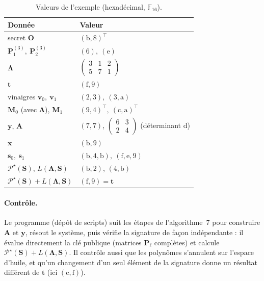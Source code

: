 \begin{table}[ht]\centering\small
\caption{Valeurs de l'exemple (hexadécimal, $\mathbb{F}_{16}$).}
\begin{tabular}{@{}ll@{}}\toprule
Donnée & Valeur\\\midrule
secret $\mathbf{O}$ & $(\mathrm{b},8)^{\top}$\\
$\mathbf{P}^{(3)}_1,\ \mathbf{P}^{(3)}_2$ & $(6),\ (\mathrm{e})$\\
$\boldsymbol{\Lambda}$ & $\begin{pmatrix}3&1&2\\5&7&1\end{pmatrix}$\\
$\mathbf{t}$ & $(\mathrm{f},9)$\\
vinaigres $\mathbf{v}_0,\ \mathbf{v}_1$ & $(2,3),\ (3,\mathrm{a})$\\
$\mathbf{M}_0$ (avec $\boldsymbol{\Lambda}$), $\mathbf{M}_1$ & $(9,4)^{\top},\ (\mathrm{c},\mathrm{a})^{\top}$\\
$\mathbf{y}$, $\mathbf{A}$ & $(7,7)$, $\begin{pmatrix}6&3\\2&4\end{pmatrix}$ (déterminant $\mathrm{d}$)\\
$\mathbf{x}$ & $(\mathrm{b},9)$\\
$\mathbf{s}_0,\ \mathbf{s}_1$ & $(\mathrm{b},4,\mathrm{b}),\ (\mathrm{f},\mathrm{e},9)$\\
$\mathcal{P}^\star(\mathbf{S})$, $L(\boldsymbol{\Lambda},\mathbf{S})$ & $(\mathrm{b},2)$, $(4,\mathrm{b})$\\
$\mathcal{P}^\star(\mathbf{S})+L(\boldsymbol{\Lambda},\mathbf{S})$ & $(\mathrm{f},9)=\mathbf{t}$\\\bottomrule
\end{tabular}
\end{table}

\paragraph{Contrôle.} Le programme  (dépôt de scripts) suit les étapes de l'algorithme~7 pour construire $\mathbf{A}$ et $\mathbf{y}$, résout le système, puis vérifie la signature de façon indépendante : il évalue directement la clé publique (matrices $\mathbf{P}_\ell$ complètes) et calcule $\mathcal{P}^\star(\mathbf{S})+L(\boldsymbol{\Lambda},\mathbf{S})$. Il contrôle aussi que les polynômes s'annulent sur l'espace d'huile, et qu'un changement d'un seul élément de la signature donne un résultat différent de $\mathbf{t}$ (ici $(\mathrm{c},\mathrm{f})$).

